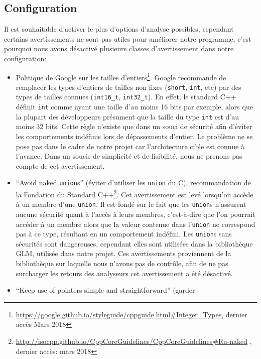 \subsection{Configuration}\label{configuration}

Il est souhaitable d'activer le plus d'options d'analyse possibles,
cependant certains avertissements ne sont pas utiles pour améliorer
notre programme, c'est pourquoi nous avons désactivé plusieurs classes
d'avertissement dans notre configuration:

\begin{itemize}
\item
  Politique de Google sur les tailles
  d'entiers\footnote{\url{https://google.github.io/styleguide/cppguide.html\#Integer_Types}, dernier accès Mars 2018}. Google recommande de remplacer
  les types d'entiers de tailles non fixes (\texttt{short},
  \texttt{int}, etc) par des types de tailles connues
  (\texttt{int16\_t}, \texttt{int32\_t}). En effet, le standard C++
  définit \texttt{int} comme ayant une taille d'au moins 16 bits par
  exemple, alors que la plupart des développeurs présument que la taille
  du type \texttt{int} est d'au moins 32 bits. Cette règle n'existe que
  dans un souci de sécurité afin d'éviter les comportements indéfinis
  lors de dépassements d'entier. Le problème ne se pose pas dans le cadre
  de notre projet car l'architecture cible est connue à l'avance. Dans
  un soucis de simplicité et de lisibilité, nous ne prenons pas compte
  de cet avertissement.
\item
  ``Avoid naked \texttt{union}s'' (éviter d'utiliser les \texttt{union}
  du C), recommandation de la Fondation du Standard
  C++\footnote{\url{http://isocpp.github.io/CppCoreGuidelines/CppCoreGuidelines\#Ru-naked} , dernier accès: mars 2018}. Cet avertissement est levé
  lorsqu'on accède à un membre d'une \texttt{union}. Il est fondé sur le
  fait que les \texttt{union}s n'assurent aucune sécurité quant à
  l'accès à leurs membres, c'est-à-dire que l'on pourrait accéder à un
  membre alors que la valeur contenue dans l'\texttt{union} ne
  correspond pas à ce type, résultant en un comportement indéfini. Les
  \texttt{union}s sans sécurités sont dangereuses, cependant elles sont
  utilisées dans la bibliothèque GLM, utilisée dans notre projet. Ces
  avertissements proviennent de la bibliothèque sur laquelle nous
  n'avons pas de contrôle, afin de ne pas surcharger les retours des
  analyseurs cet avertissement a été désactivé.
\item
  ``Keep use of pointers simple and straightforward'' (garder

\end{itemize}
